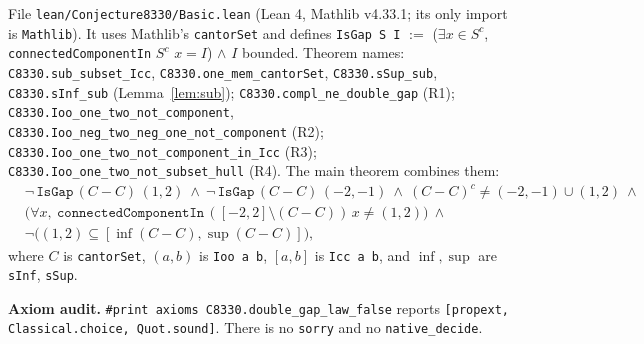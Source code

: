 \documentclass[11pt]{article}
\theoremstyle{definition}
\theoremstyle{remark}
\begin{document}
File \texttt{lean/Conjecture8330/Basic.lean} (Lean 4, Mathlib v4.33.1; its only import is
\texttt{Mathlib}). It uses Mathlib's \texttt{cantorSet} and defines
\texttt{IsGap S I} $:=$ ($\exists x\in S^c$, \texttt{connectedComponentIn} $S^c$ $x = I$) $\wedge$
$I$ bounded. Theorem names: \texttt{C8330.sub\_subset\_Icc}, \texttt{C8330.one\_mem\_cantorSet},
\texttt{C8330.sSup\_sub}, \texttt{C8330.sInf\_sub} (Lemma~\ref{lem:sub});
\texttt{C8330.compl\_ne\_double\_gap} (R1); \texttt{C8330.Ioo\_one\_two\_not\_component},
\texttt{C8330.Ioo\_neg\_two\_neg\_one\_not\_component} (R2);
\texttt{C8330.Ioo\_one\_two\_not\_component\_in\_Icc} (R3);
\texttt{C8330.Ioo\_one\_two\_not\_subset\_hull} (R4). The main theorem combines them:
\begin{align*}
&\neg\,\mathtt{IsGap}\,(C-C)\,(1,2)\ \wedge\ \neg\,\mathtt{IsGap}\,(C-C)\,(-2,-1)\ \wedge\
(C-C)^{c}\ne(-2,-1)\cup(1,2)\ \wedge\\
&\bigl(\forall x,\ \mathtt{connectedComponentIn}\,([-2,2]\setminus(C-C))\,x\ne(1,2)\bigr)\ \wedge\\
&\neg\bigl((1,2)\subseteq[\inf(C-C),\sup(C-C)]\bigr),
\end{align*}
where $C$ is \texttt{cantorSet}, $(a,b)$ is \texttt{Ioo a b}, $[a,b]$ is \texttt{Icc a b}, and
$\inf,\sup$ are \texttt{sInf}, \texttt{sSup}.

\textbf{Axiom audit.} \texttt{\#print axioms C8330.double\_gap\_law\_false} reports
\texttt{[propext, Classical.choice, Quot.sound]}. There is no \texttt{sorry} and no
\texttt{native\_decide}.
\end{document}
